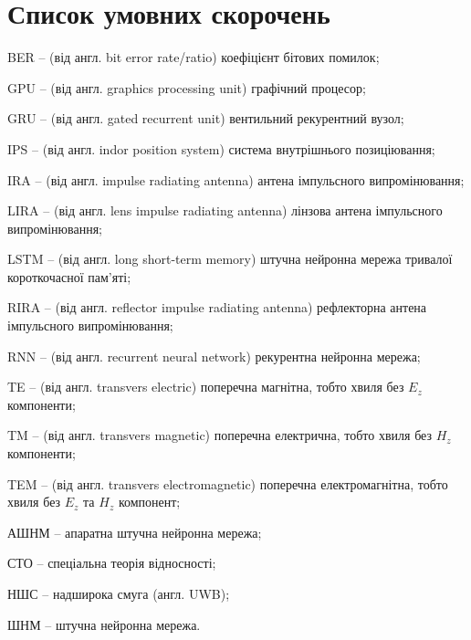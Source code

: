 \chapter*{Список умовних скорочень}


BER -- (від англ. bit error rate/ratio) коефіцієнт бітових помилок;

GPU -- (від англ. graphics processing unit) графічний процесор;

GRU -- (від англ. gated recurrent unit) вентильний рекурентний вузол;

IPS -- (від англ. indor position system) система внутрішнього позиціювання;

IRA -- (від англ. impulse radiating antenna) антена імпульсного випромінювання;

LIRA -- (від англ. lens impulse radiating antenna) лінзова антена імпульсного
випромінювання;

LSTM -- (від англ. long short-term memory) штучна нейронна мережа тривалої 
короткочасної пам'яті;

RIRA -- (від англ. reflector impulse radiating antenna) рефлекторна антена 
імпульсного випромінювання;

RNN -- (від англ. recurrent neural network) рекурентна нейронна мережа;

TE -- (від англ. transvers electric) поперечна магнітна, тобто хвиля без 
$ E_z $ компоненти;

TM -- (від англ. transvers magnetic) поперечна електрична, тобто хвиля без 
$ H_z $ компоненти;

TEM -- (від англ. transvers electromagnetic) поперечна електромагнітна, тобто 
хвиля  без $ E_z $ та $ H_z $ компонент;

АШНМ -- апаратна штучна нейронна мережа;

СТО -- спеціальна теорія відносності;

НШС -- надширока смуга (англ. UWB);

ШНМ -- штучна нейронна мережа.
